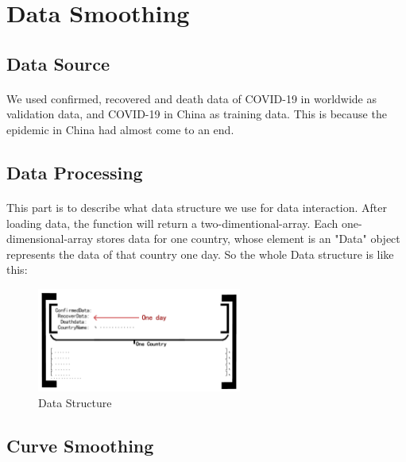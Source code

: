 \documentclass[]{article}
\begin{document}
\section{Data Smoothing}
\subsection{Data Source}
\paragraph{}
We used
confirmed, recovered and death data of COVID-19 in worldwide as validation data, and COVID-19 in China as training data. This is because the epidemic in China had almost come to an end.
\subsection{Data Processing}
\paragraph{}
This part is to describe what data structure we use for data interaction.
After loading data, the function will return a two-dimentional-array.
Each one-dimensional-array stores data for one country, whose element 
is an "Data" object represents the data of that country one day. 
So the whole Data structure is like this:
\begin{figure}[H]
    \centering
    \includegraphics[width = 0.6\textwidth]{Data_Structure.png}
    \caption{Data Structure}
\end{figure}
\subsection{Curve Smoothing}
\end{document}

